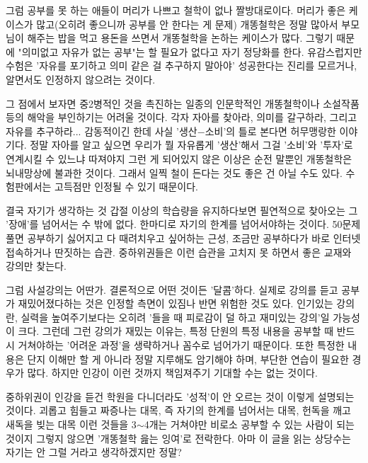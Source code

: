 그럼 공부를 못 하는 애들이 머리가 나쁘고 철학이 없나
짤방대로이다. 머리가 좋은 케이스가 많고(오히려 좋으니까 공부를 안 한다는 게 문제)
개똥철학은 정말 많아서 부모님이 해주는 밥을 먹고 용돈을 쓰면서 개똥철학을 논하는 케이스가 많다.
그렇기 때문에 "의미없고 자유가 없는 공부"는 할 필요가 없다고 자기 정당화를 한다.
유감스럽지만 수험은 '자유를 포기하고 의미 같은 걸 추구하지 말아야' 성공한다는 진리를 모르거나, 알면서도 인정하지 않으려는 것이다.
\vspace{5mm}

그 점에서 보자면 중2병적인 것을 촉진하는 일종의 인문학적인 개똥철학이나 소설작품 등의 해악을 부인하기는 어려울 것이다.
각자 자아를 찾아라, 의미를 갈구하라, 그리고 자유를 추구하라... 감동적이긴 한데 사실 '생산$-$소비'의 틀로 본다면 허무맹랑한 이야기다.
정말 자아를 알고 싶으면 우리가 뭘 자유롭게 '생산'해서 그걸 '소비'와 '투자'로 연계시킬 수 있느냐 따져야지
그런 게 되어있지 않은 이상은 순전 말뿐인 개똥철학은 뇌내망상에 불과한 것이다.
그래서 일찍 철이 든다는 것도 좋은 건 아닐 수도 있다. 수험판에서는 고득점만 인정될 수 있기 때문이다.
\vspace{5mm}

결국 자기가 생각하는 것 갑절 이상의 학습량을 유지하다보면 필연적으로 찾아오는 그 '장애'를 넘어서는 수 밖에 없다.
한마디로 자기의 한계를 넘어서야하는 것이다.
50문제 풀면 공부하기 싫어지고 다 때려치우고 싶어하는 근성, 조금만 공부하다가 바로 인터넷 접속하거나 딴짓하는 습관.
중하위권들은 이런 습관을 고치지 못 하면서 좋은 교재와 강의만 찾는다.
\vspace{5mm}

그럼 사설강의는 어딴가. 결론적으로 어떤 것이든 '달콤'하다.
실제로 강의를 듣고 공부가 재밌어졌다하는 것은 인정할 측면이 있짐나 반면 위험한 것도 있다.
인기있는 강의란, 실력을 높여주기보다는 오히려 '들을 때 피로감이 덜 하고 재미있는 강의'일 가능성이 크다.
그런데 그런 강의가 재밌는 이유는, 특정 단원의 특정 내용을 공부할 때 반드시 거쳐야하는 '어려운 과정'을 생략하거나 꼼수로 넘어가기 때문이다.
또한 특정한 내용은 단지 이해만 할 게 아니라 정말 지루해도 암기해야 하며, 부단한 연습이 필요한 경우가 많다.
하지만 인강이 이런 것까지 책임져주기 기대할 수는 없는 것이다.
\vspace{5mm}

중하위권이 인강을 듣건 학원을 다니더라도 '성적'이 안 오르는 것이 이렇게 설명되는 것이다.
괴롭고 힘들고 짜증나는 대목, 즉 자기의 한계를 넘어서는 대목, 헌독을 깨고 새독을 빚는 대목
이런 것들을 3$\sim$4개는 거쳐야만 비로소 공부할 수 있는 사람이 되는 것이지 그렇지 않으면 '개똥철학 읊는 잉여'로 전락한다.
아마 이 글을 읽는 상당수는 자기는 안 그럴 거라고 생각하겠지만 정말?
\vspace{5mm}

